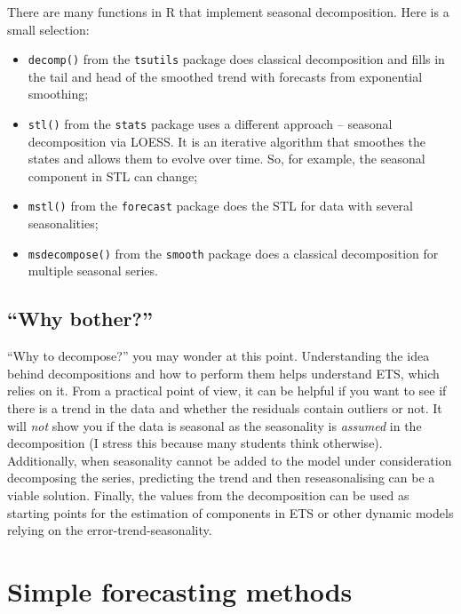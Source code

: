 \documentclass[
]{book}
\providecommand{\tightlist}{%
  \setlength{\itemsep}{0pt}\setlength{\parskip}{0pt}}
\theoremstyle{definition}
\theoremstyle{definition}
\theoremstyle{definition}
\theoremstyle{definition}
\theoremstyle{remark}
\begin{document}
There are many functions in R that implement seasonal decomposition. Here is a small selection:

\begin{itemize}
\tightlist
\item
  \texttt{decomp()} from the \texttt{tsutils} package does classical decomposition and fills in the tail and head of the smoothed trend with forecasts from exponential smoothing;
\item
  \texttt{stl()} from the \texttt{stats} package uses a different approach -- seasonal decomposition via LOESS. It is an iterative algorithm that smoothes the states and allows them to evolve over time. So, for example, the seasonal component in STL can change;
\item
  \texttt{mstl()} from the \texttt{forecast} package does the STL for data with several seasonalities;
\item
  \texttt{msdecompose()} from the \texttt{smooth} package does a classical decomposition for multiple seasonal series.
\end{itemize}

\hypertarget{why-bother}{%
\subsection{``Why bother?''}\label{why-bother}}

``Why to decompose?'' you may wonder at this point. Understanding the idea behind decompositions and how to perform them helps understand ETS, which relies on it. From a practical point of view, it can be helpful if you want to see if there is a trend in the data and whether the residuals contain outliers or not. It will \emph{not} show you if the data is seasonal as the seasonality is \emph{assumed} in the decomposition (I stress this because many students think otherwise). Additionally, when seasonality cannot be added to the model under consideration decomposing the series, predicting the trend and then reseasonalising can be a viable solution. Finally, the values from the decomposition can be used as starting points for the estimation of components in ETS or other dynamic models relying on the error-trend-seasonality.

\hypertarget{simpleForecastingMethods}{%
\section{Simple forecasting methods}\label{simpleForecastingMethods}}
\end{document}
